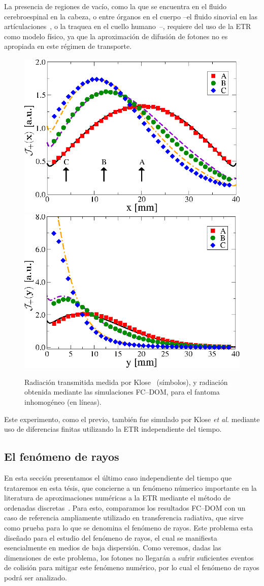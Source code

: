 La presencia de regiones de vacío, como la que se encuentra en el 
fluido cerebroespinal en la cabeza, o entre órganos en el cuerpo 
--el fluido sinovial en las artículaciones~\cite{Netz2001}, 
o la traquea en el cuello humano~\cite{Fujii2016}--, 
requiere del uso de la ETR como modelo físico, ya que la 
aproximación de difusión de fotones no es apropiada en este régimen de transporte. 
\begin{figure}[h!]
\centering
  \includegraphics[width=0.48\linewidth]{figuras/kloseph2x.eps}
  \includegraphics[width=0.48\linewidth]{figuras/ph2y.eps}
  \caption{Radiación transmitida medida por Klose~\cite{Klose2002} (símbolos),
  y radiación obtenida mediante las simulaciones FC--DOM, para 
  el fantoma inhomogéneo (en líneas).}
 \label{fig:fluxph2}
\end{figure}
Este experimento, como el previo, también fue simulado por Klose {\it et al.} 
\cite{Klose2002} mediante uso de diferencias finitas utilizando la ETR 
independiente del tiempo.

\subsection{El fenómeno de rayos}
\label{subsec:rayeff}
En esta sección presentamos el último caso independiente del tiempo 
que trataremos en esta tésis, que concierne a un 
fenómeno númerico importante en la literatura 
de aproximaciones numéricas a la ETR mediante el método 
de ordenadas discretas~\cite{Lewis1984}. 
Para esto, comparamos los resultados FC--DOM con un caso 
de referencia ampliamente utilizado en transferencia radiativa, 
que sirve como prueba para lo que se denomina el fenómeno 
de rayos. Este problema esta diseñado para el estudio del fenómeno de rayos, 
el cual se manifiesta esencialmente en medios de baja dispersión. 
Como veremos, dadas las dimensiones de este problema, 
los fotones no llegarán a sufrir suficientes eventos de colisión para mitigar este fenómeno numérico, por lo cual el fenómeno de rayos podrá ser analizado.

